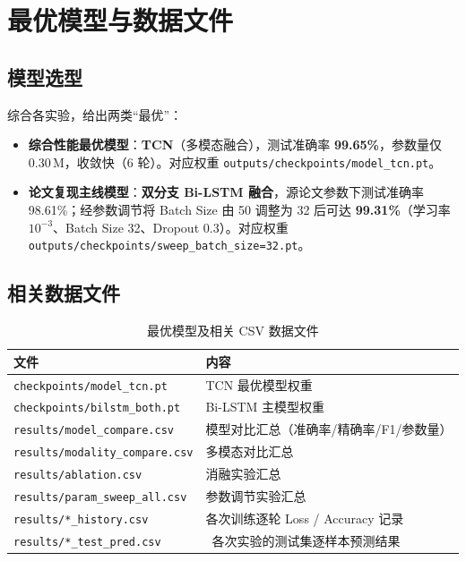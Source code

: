 \documentclass[11pt,a4paper]{ctexart}
\begin{document}



\section{最优模型与数据文件}

\subsection{模型选型}

综合各实验，给出两类“最优”：

\begin{itemize}[leftmargin=2em]
\item \textbf{综合性能最优模型}：\textbf{TCN}（多模态融合），测试准确率 \textbf{99.65\%}，参数量仅 0.30\,M，收敛快（6 轮）。对应权重 \texttt{outputs/checkpoints/model\_tcn.pt}。
\item \textbf{论文复现主线模型}：\textbf{双分支 Bi-LSTM 融合}，源论文参数下测试准确率 98.61\%；经参数调节将 Batch Size 由 50 调整为 32 后可达 \textbf{99.31\%}（学习率 $10^{-3}$、Batch Size 32、Dropout 0.3）。对应权重 \texttt{outputs/checkpoints/sweep\_batch\_size=32.pt}。
\end{itemize}

\subsection{相关数据文件}

\begin{table}[htbp]\centering
\caption{最优模型及相关 CSV 数据文件}
\label{tab:files}
\begin{tabular}{ll}
\toprule
文件 & 内容 \\
\midrule
\texttt{checkpoints/model\_tcn.pt} & TCN 最优模型权重 \\
\texttt{checkpoints/bilstm\_both.pt} & Bi-LSTM 主模型权重 \\
\texttt{results/model\_compare.csv} & 模型对比汇总（准确率/精确率/F1/参数量） \\
\texttt{results/modality\_compare.csv} & 多模态对比汇总 \\
\texttt{results/ablation.csv} & 消融实验汇总 \\
\texttt{results/param\_sweep\_all.csv} & 参数调节实验汇总 \\
\texttt{results/*\_history.csv} & 各次训练逐轮 Loss / Accuracy 记录 \\
\texttt{results/*\_test\_pred.csv} & ~各次实验的测试集逐样本预测结果 \\
\bottomrule
\end{tabular}
\end{table}
\end{document}
